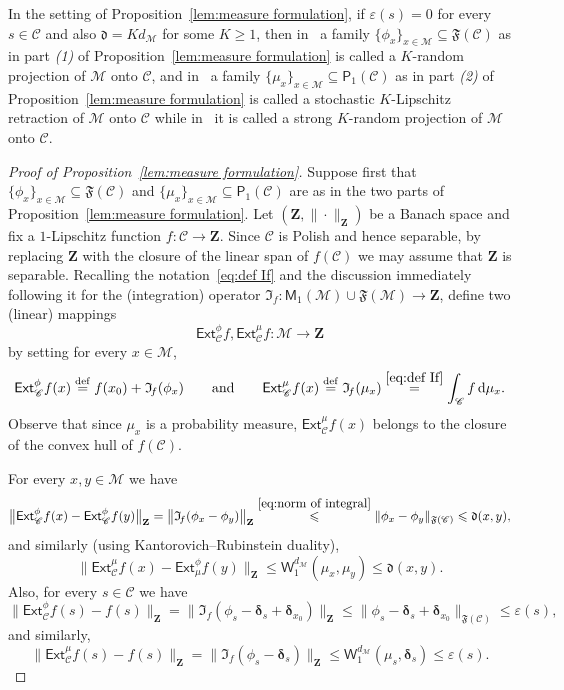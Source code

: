 \documentclass[11pt,reqno]{amsart}
\renewcommand{\le}{\leqslant}
\renewcommand{\ge}{\geqslant}
\newcommand{\ud}[0]{\,\mathrm{d}}
\newcommand{\bd}{\boldsymbol{\delta}}
\renewcommand{\bd}{\boldsymbol{\delta}}
\newcommand{\e}{\varepsilon}
\theoremstyle{remark}
\newcommand{\MM}{\mathcal{M}}
\renewcommand{\subset}{\subseteq}
\newcommand{\W}{\mathsf{W}}
\newcommand{\eqdef}{\stackrel{\mathrm{def}}{=}}
\newcommand{\bfZ}{\mathbf{Z}}
\newcommand{\sub}{\mathscr{C}}
\renewcommand{\1}{\mathbf 1}
\begin{document}
In the setting of Proposition~\ref{lem:measure formulation}, if  $\e(s)= 0$ for every $s\in \sub$ and also $\mathfrak{d}=Kd_\MM$   for some $K\ge 1$, then in~\cite[Definition~2.7]{AP20} a family $\{\phi_x\}_{x\in \MM}\subset \mathfrak{F}(\sub)$ as in part {\em (1)} of Proposition~\ref{lem:measure formulation} is called a $K$-random projection of $\MM$ onto $\sub$, and in~\cite[Definition~3.1]{Oht09} a family $\{\mu_x\}_{x\in \MM}\subset \mathsf{P}_1(\sub)$ as in part {\em (2)} of Proposition~\ref{lem:measure formulation} is called a stochastic $K$-Lipschitz retraction of $\MM$ onto $\sub$ while in~\cite[Definition~2.7]{AP20} it is called a strong $K$-random projection of $\MM$ onto $\sub$.



\begin{proof}[Proof of Proposition~\ref{lem:measure formulation}] Suppose first that $\{\phi_x\}_{x\in \MM}\subset \mathfrak{F}(\sub)$ and $\{\mu_x\}_{x\in \MM}\subset \mathsf{P}_1(\sub)$ are as in the two parts of Proposition~\ref{lem:measure formulation}.  Let $(\bfZ,\|\cdot\|_\bfZ)$ be a Banach space and fix a $1$-Lipschitz function $f:\sub\to \bfZ$.  Since $\sub$ is Polish and hence separable, by replacing $\bfZ$ with the closure of the linear span of $f(\sub)$ we may assume that $\bfZ$ is separable. Recalling the notation~\eqref{eq:def If} and the discussion immediately following it for the (integration) operator $\mathfrak{I}_{\! f}:\mathsf{M}_1(\MM)\cup\mathfrak{F}(\MM)\to \bfZ$, define two (linear) mappings $$\mathsf{Ext}_\sub^\phi f,\mathsf{Ext}_\sub^\mu f:\MM\to \bfZ$$ by setting for every $x\in \MM$,
\begin{equation}\label{eq:def extensoion operators}
\mathsf{Ext}_\sub^\phi f(x)\eqdef f(x_0)+\mathfrak{I}_{\! f}(\phi_x)\qquad\mathrm{and}\qquad \mathsf{Ext}_\sub^\mu f(x)\eqdef \mathfrak{I}_{\! f}(\mu_x)\stackrel{\eqref{eq:def If}}{=}\int_\sub f\ud\mu_x.
\end{equation}
Observe that since $\mu_x$ is a probability measure, $\mathsf{Ext}_\sub^\mu f(x)$ belongs to the closure of the convex hull of $f(\sub)$.

For every $x,y\in \MM$ we have
$$
\big\| \mathsf{Ext}_\sub^\phi f(x)- \mathsf{Ext}_\sub^\phi f(y)\big\|_\bfZ=\big\|\mathfrak{I}_{\! f}(\phi_x-\phi_y)\big\|_\bfZ\stackrel{\eqref{eq:norm of integral}}{\le} \|\phi_x-\phi_y\|_{\mathfrak{F}(\sub)}\le \mathfrak{d}(x,y),
$$
and similarly (using Kantorovich--Rubinstein duality),
$$
\big\| \mathsf{Ext}_\sub^\mu f(x)- \mathsf{Ext}_\mu^\phi f(y)\big\|_\bfZ\le \W_1^{d_\MM}(\mu_x,\mu_y)\le \mathfrak{d}(x,y).
$$
Also, for every $s\in \sub$ we have
$$
\big\|\mathsf{Ext}_\sub^\phi f(s)-f(s)\big\|_{\bfZ}= \big\|\mathfrak{I}_{\! f}(\phi_s-\bd_s+\bd_{x_0})\big\|_{\bfZ}\le\|\phi_s-\bd_s+\bd_{x_0} \|_{\mathfrak{F}(\sub)}\le \e(s),
$$
and similarly,
$$
\big\|\mathsf{Ext}_\sub^\mu f(s)-f(s)\big\|_{\bfZ}= \big\|\mathfrak{I}_{\! f}(\phi_s-\bd_s)\big\|_{\bfZ}\le\W_1^{d_\MM}(\mu_s,\bd_s)\le \e(s).
$$



\end{proof}
\end{document}
